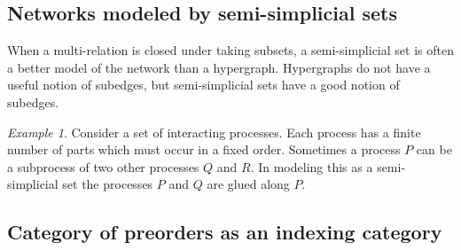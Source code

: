 \documentclass[10pt]{article}
\theoremstyle{remark}
\newtheorem{example}{Example}
\begin{document}
\subsection{Networks modeled by semi-simplicial sets}
When a multi-relation is closed under taking subsets, a semi-simplicial set is often a better model of the network than a hypergraph. Hypergraphs do not have a useful notion of subedges, but semi-simplicial sets have a good notion of subedges.

\begin{example}
Consider a set of interacting processes. Each process has a finite number of parts which must occur in a fixed order.
Sometimes a process $P$ can be a subprocess of two other processes $Q$ and $R$. In modeling this as a semi-simplicial set the processes $P$ and $Q$ are glued along $P$.
\end{example}

\subsection{Category of preorders as an indexing category}
\end{document}
